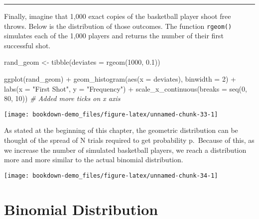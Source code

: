 \documentclass[
]{book}
\newenvironment{Shaded}{\begin{snugshade}}{\end{snugshade}}
\newcommand{\AttributeTok}[1]{\textcolor[rgb]{0.77,0.63,0.00}{#1}}
\newcommand{\CommentTok}[1]{\textcolor[rgb]{0.56,0.35,0.01}{\textit{#1}}}
\newcommand{\DecValTok}[1]{\textcolor[rgb]{0.00,0.00,0.81}{#1}}
\newcommand{\FloatTok}[1]{\textcolor[rgb]{0.00,0.00,0.81}{#1}}
\newcommand{\FunctionTok}[1]{\textcolor[rgb]{0.00,0.00,0.00}{#1}}
\newcommand{\NormalTok}[1]{#1}
\newcommand{\OtherTok}[1]{\textcolor[rgb]{0.56,0.35,0.01}{#1}}
\newcommand{\SpecialCharTok}[1]{\textcolor[rgb]{0.00,0.00,0.00}{#1}}
\newcommand{\StringTok}[1]{\textcolor[rgb]{0.31,0.60,0.02}{#1}}
\begin{document}
\begin{center}\rule{0.5\linewidth}{0.5pt}\end{center}

Finally, imagine that 1,000 exact copies of the basketball player shoot free throws. Below is the distribution of those outcomes. The function \texttt{rgeom()} simulates each of the 1,000 players and returns the number of their first successful shot.

\begin{Shaded}
\begin{Highlighting}[]
\NormalTok{rand\_geom }\OtherTok{\textless{}{-}} \FunctionTok{tibble}\NormalTok{(}\AttributeTok{deviates =} \FunctionTok{rgeom}\NormalTok{(}\DecValTok{1000}\NormalTok{, }\FloatTok{0.1}\NormalTok{))}

\FunctionTok{ggplot}\NormalTok{(rand\_geom) }\SpecialCharTok{+}
  \FunctionTok{geom\_histogram}\NormalTok{(}\FunctionTok{aes}\NormalTok{(}\AttributeTok{x =}\NormalTok{ deviates),}
                 \AttributeTok{binwidth =} \DecValTok{2}\NormalTok{) }\SpecialCharTok{+}
  \FunctionTok{labs}\NormalTok{(}\AttributeTok{x =} \StringTok{"First Shot"}\NormalTok{, }\AttributeTok{y =} \StringTok{"Frequency"}\NormalTok{) }\SpecialCharTok{+}
  \FunctionTok{scale\_x\_continuous}\NormalTok{(}\AttributeTok{breaks =} \FunctionTok{seq}\NormalTok{(}\DecValTok{0}\NormalTok{, }\DecValTok{80}\NormalTok{, }\DecValTok{10}\NormalTok{)) }\CommentTok{\# Added more ticks on x axis}
\end{Highlighting}
\end{Shaded}

\begin{center}\texttt{[image: bookdown-demo\_files/figure-latex/unnamed-chunk-33-1]} \end{center}

As stated at the beginning of this chapter, the geometric distribution can be thought of the spread of N trials required to get probability p.~Because of this, as we increase the number of simulated basketball players, we reach a distribution more and more similar to the actual binomial distribution.

\begin{center}\texttt{[image: bookdown-demo\_files/figure-latex/unnamed-chunk-34-1]} \end{center}

\hypertarget{Binomial}{%
\section{Binomial Distribution}\label{Binomial}}
\end{document}
